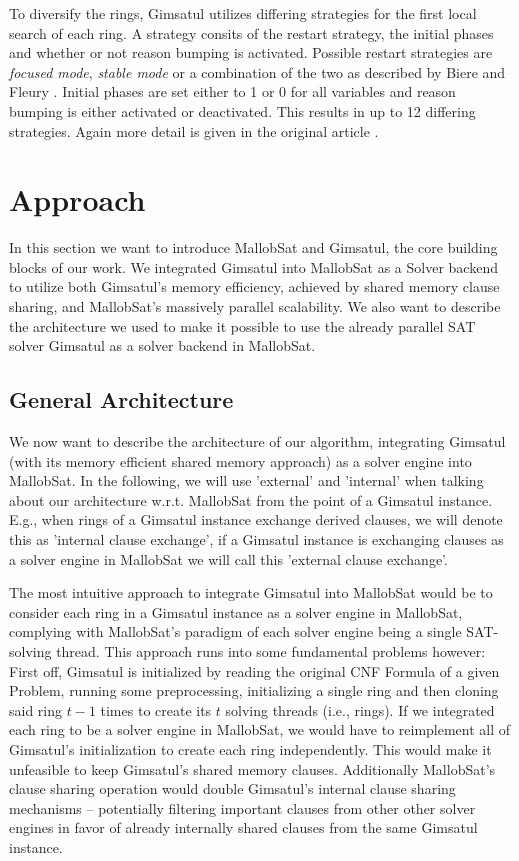 \documentclass[12pt,a4paper,twoside]{scrartcl}
\numberwithin{equation}{section}
\begin{document}
To diversify the rings, Gimsatul utilizes differing strategies for the first local search of each ring. A strategy consits of the restart strategy, the initial phases and whether or not reason bumping is activated. Possible restart strategies are \textit{focused mode}, \textit{stable mode} or a combination of the two as described by Biere and Fleury \cite{restartStrategy}. Initial phases are set either to 1 or 0 for all variables and reason bumping is either activated or deactivated. This results in up to 12 differing strategies. Again more detail is given in the original article \cite{gimsatul}.


\section{Approach}

In this section we want to introduce MallobSat and Gimsatul, the core building blocks of our work. We integrated Gimsatul into MallobSat as a Solver backend to utilize both Gimsatul's memory efficiency, achieved by shared memory clause sharing, and MallobSat's massively parallel scalability. We also want to describe the architecture we used to make it possible to use the already parallel SAT solver Gimsatul as a solver backend in MallobSat.

\subsection{General Architecture}

We now want to describe the architecture of our algorithm, integrating Gimsatul (with its memory efficient shared memory approach) as a solver engine into MallobSat. In the following, we will use 'external' and 'internal' when talking about our architecture w.r.t. MallobSat from the point of a Gimsatul instance. E.g., when rings of a Gimsatul instance exchange derived clauses, we will denote this as 'internal clause exchange', if a Gimsatul instance is exchanging clauses as a solver engine in MallobSat we will call this 'external clause exchange'.

The most intuitive approach to integrate Gimsatul into MallobSat would be to consider each ring in a Gimsatul instance as a solver engine in MallobSat, complying with MallobSat's paradigm of each solver engine being a single SAT-solving thread. This approach runs into some fundamental problems however: 
First off, Gimsatul is initialized by reading the original CNF Formula of a given Problem, running some preprocessing, initializing a single ring and then cloning said ring $t - 1$ times to create its $t$ solving threads (i.e., rings). If we integrated each ring to be a solver engine in MallobSat, we would have to reimplement all of Gimsatul's initialization to create each ring independently. This would make it unfeasible to keep Gimsatul's shared memory clauses. Additionally MallobSat's clause sharing operation would double Gimsatul's internal clause sharing mechanisms -- potentially filtering important clauses from other other solver engines in favor of already internally shared clauses from the same Gimsatul instance.
\end{document}
